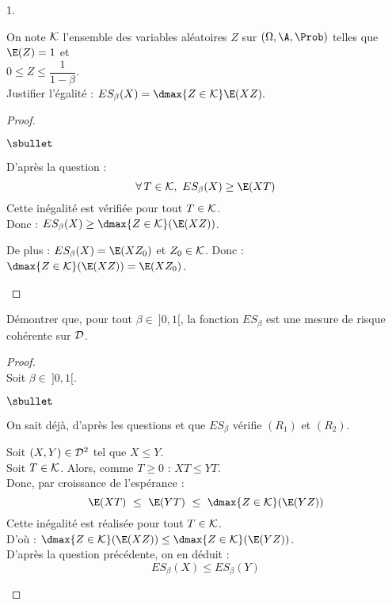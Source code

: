\documentclass[11pt]{article}%
\begin{document}
\begin{noliste}{1.}
  
  
  
  

  \item On note ${\cal K}$ l'ensemble des variables aléatoires $Z$ 
  sur $(\Omega,\A,\Prob)$ telles que $\E(Z)=1$ et \\
  $0\leq Z \leq \dfrac{1}{1-\beta}$.\\[.1cm]
  Justifier l'égalité : $ES_\beta(X)= \dmax{Z \in {\cal K}} 
  \E(XZ).$
  
  \begin{proof}~
    \begin{noliste}{$\sbullet$}
      \item D'après la question  :
      \[
        \forall \, T \in {\cal K}, \ ES_\beta(X) \geq \E(XT)
      \]
      Cette inégalité est vérifiée pour tout $T \in {\cal K}$.\\[.1cm]
      Donc : $ES_\beta(X) \geq \dmax{Z \in {\cal K}}(\E(XZ))$.
      
      \item De plus : $ES_\beta(X) = \E(X Z_0)$ et $Z_0 \in {\cal K}$.
      Donc : $\dmax{Z \in {\cal K}}(\E(XZ)) = \E(XZ_0)$.
      ~\\[-1.6cm]
    \end{noliste}
  \end{proof}
  
  
  \item Démontrer que, pour tout $\beta \in \ ]0,1[$, la fonction 
  $ES_\beta$ est une mesure de risque cohérente sur ${\cal D}$.
  
  \begin{proof}~\\
    Soit $\beta \in \ ]0,1[$.
    \begin{noliste}{$\sbullet$}
      \item On sait déjà, d'après les questions  et 
       que $ES_\beta$ vérifie $(R_1)$ et $(R_2)$.
      
      \item Soit $(X,Y) \in {\cal D}^2$ tel que $X \leq Y$.\\
      Soit $T \in {\cal K}$. Alors, comme $T\geq 0$ : $XT \leq YT$.\\
      Donc, par croissance de l'espérance :
      \[
        \E(XT) \ \leq \ \E(YT) \ \leq \ \dmax{Z\in {\cal K}}
        (\E(YZ))
      \]
      Cette inégalité est réalisée pour tout $T\in {\cal K}$.\\
      D'où : $\dmax{Z\in {\cal K}}(\E(XZ)) \leq \dmax{Z\in {\cal K}}
      (\E(YZ))$.\\
      D'après la question précédente, on en déduit :
      \[
        ES_\beta(X) \leq ES_\beta(Y)
      \]
      

\end{noliste}
\end{proof}
\end{noliste}
\end{document}
